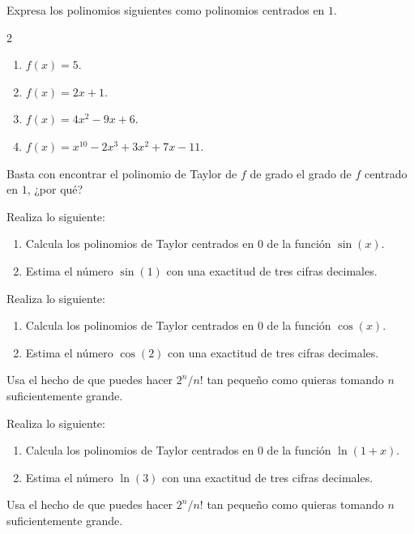 \documentclass[12pt,a4paper]{book}
\begin{document}
    \begin{ejercicio}\label{ej:319}
        Expresa los polinomios siguientes como polinomios centrados
        en $1$.
        \begin{multicols}{2}
        \begin{enumerate}[nosep]
            \item $f(x)=5$.
            \item $f(x)=2x+1$.
            \item $f(x)=4x^{2}-9x+6$.
            \item $f(x)=x^{10}-2x^{3}+3x^{2}+7x-11$.
        \end{enumerate}
        \end{multicols}
        \sugerencia Basta con encontrar el polinomio de Taylor de $f$ de grado el
        grado de $f$ centrado en $1$, ¿por qué?
    \end{ejercicio}

    \begin{ejercicio}\label{ej:320}
        Realiza lo siguiente:
        \begin{enumerate}[nosep]
            \item Calcula los polinomios de Taylor centrados en $0$ de la función $\sin(x)$.
            \item Estima el número $\sin(1)$ con una exactitud de tres cifras decimales.
        \end{enumerate}
    \end{ejercicio}

    \begin{ejercicio}\label{ej:321}
        Realiza lo siguiente:
        \begin{enumerate}[nosep]
            \item Calcula los polinomios de Taylor centrados en $0$ de la función $\cos(x)$.
            \item Estima el número $\cos(2)$ con una exactitud de tres cifras decimales.
        \end{enumerate}
        \sugerencia Usa el hecho de que puedes hacer $2^{n}/n!$ tan pequeño como
        quieras tomando $n$ suficientemente grande.
    \end{ejercicio}

    \begin{ejercicio}\label{ej:322}
        Realiza lo siguiente:
        \begin{enumerate}[nosep]
            \item Calcula los polinomios de Taylor centrados en $0$ de la función $\ln(1+x)$.
            \item Estima el número $\ln(3)$ con una exactitud de tres cifras decimales.
        \end{enumerate}
        \sugerencia Usa el hecho de que puedes hacer $2^{n}/n!$ tan pequeño como
        quieras tomando $n$ suficientemente grande.
    \end{ejercicio}


    \backmatter
    \printbibliography[heading=bibintoc,title={Referencias}]
    \printindex
\end{document}
